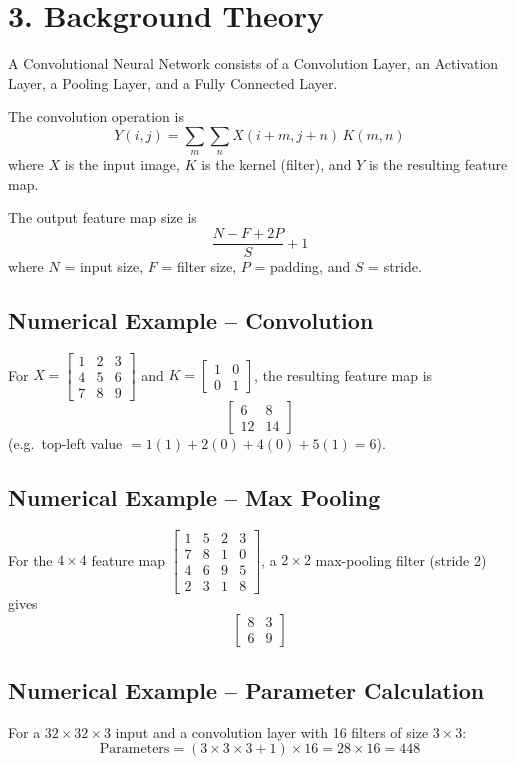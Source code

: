 \documentclass[11pt]{article}
\begin{document}
\section*{3. Background Theory}

A Convolutional Neural Network consists of a Convolution Layer, an Activation Layer, a Pooling Layer, and a Fully Connected Layer.

The convolution operation is
\[
Y(i,j) = \sum_m \sum_n X(i+m, j+n)\, K(m,n)
\]
where $X$ is the input image, $K$ is the kernel (filter), and $Y$ is the resulting feature map.

The output feature map size is
\[
\frac{N - F + 2P}{S} + 1
\]
where $N$ = input size, $F$ = filter size, $P$ = padding, and $S$ = stride.

\subsection*{Numerical Example -- Convolution}
For $X = \begin{bmatrix}1&2&3\\4&5&6\\7&8&9\end{bmatrix}$ and $K = \begin{bmatrix}1&0\\0&1\end{bmatrix}$, the resulting feature map is
\[
\begin{bmatrix} 6 & 8 \\ 12 & 14 \end{bmatrix}
\]
(e.g.\ top-left value $= 1(1)+2(0)+4(0)+5(1) = 6$).

\subsection*{Numerical Example -- Max Pooling}
For the $4\times4$ feature map $\begin{bmatrix}1&5&2&3\\7&8&1&0\\4&6&9&5\\2&3&1&8\end{bmatrix}$, a $2\times2$ max-pooling filter (stride 2) gives
\[
\begin{bmatrix} 8 & 3 \\ 6 & 9 \end{bmatrix}
\]

\subsection*{Numerical Example -- Parameter Calculation}
For a $32\times32\times3$ input and a convolution layer with 16 filters of size $3\times3$:
\[
\text{Parameters} = (3\times3\times3+1)\times16 = 28\times16 = 448
\]
\end{document}
